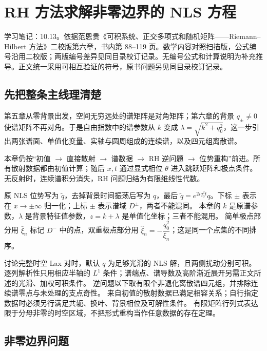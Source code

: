 \documentclass[lang=cn,scheme=chinese,mode=simple,device=normal,color=blue,
math=cm,thmcnt=section,12pt]{elegantbook}
\begin{document}
\tableofcontents\clearpage
\setcounter{chapter}{5}
\chapter{RH 方法求解非零边界的 NLS 方程}
\noindent 学习笔记：10.13。依据范恩贵《可积系统、正交多项式和随机矩阵——Riemann--Hilbert 方法》二校版第六章，书内第 88--119 页。数学内容对照扫描版，公式编号沿用二校版；两版编号差异见同目录校订记录。无编号公式和计算说明为补充推导。正文统一采用可相互验证的符号，原书问题另见同目录校订记录。

\section*{先把整条主线理清楚}
第五章从零背景出发，空间无穷远处的谱矩阵是对角矩阵；第六章的背景 $q_\pm\ne0$ 使谱矩阵不再对角。于是自由指数中的谱参数从 $k$ 变成 $\lambda=\sqrt{k^2+q_0^2}$，这一步引出两张谱面、单值化变量、实轴与圆周组成的连续谱，以及四元组离散谱。

本章仍按“初值 $\to$ 直接散射 $\to$ 谱数据 $\to$ RH 逆问题 $\to$ 位势重构”前进。所有散射数据都由初值计算；随后 $x,t$ 通过显式相位 $\theta$ 进入跳跃矩阵和极点条件。无反射时，连续谱积分消失，RH 问题归结为有限维线性代数。

\begin{callout}
    原 NLS 位势写为 $\widetilde q$，去掉背景时间振荡后写为 $q$，最后 $\widetilde q=e^{2iq_0^2t}q$。下标 $\pm$ 表示在 $x\to\pm\infty$ 归一化；上标 $\pm$ 表示谱域 $D^\pm$，两者不能混同。
    本章的 $k$ 是原谱参数，$\lambda$ 是背景特征值参数，$z=k+\lambda$ 是单值化坐标；三者不能混用。
    简单极点部分用 $\bar\xi_n$ 标记 $D^-$ 中的点，双重极点部分用 $\widehat\xi_n=-\dfrac{q_0^2}{\xi_n}$；这是同一个点集的不同排序。
\end{callout}


\begin{callout}
    讨论完整时空 Lax 对时，默认 $q$ 为足够光滑的 NLS 解，且两侧扰动分别可积。
    逐列解析性只用相应半轴的 $L^1$ 条件；谱端点、谱导数及高阶渐近展开另需正文所述的光滑、加权可积条件。
    逆问题以下取有限个非退化离散谱四元组，并排除连续谱零点与未处理的支点奇性。
    来自初值的散射数据已满足相容关系；自行指定数据时必须另行满足共轭、换叶、背景相位及可解性条件。
    有限矩阵行列式表达限于分母非零的时空区域，不把形式重构当作任意数据的存在定理。
\end{callout}

\section{非零边界问题}
\end{document}
